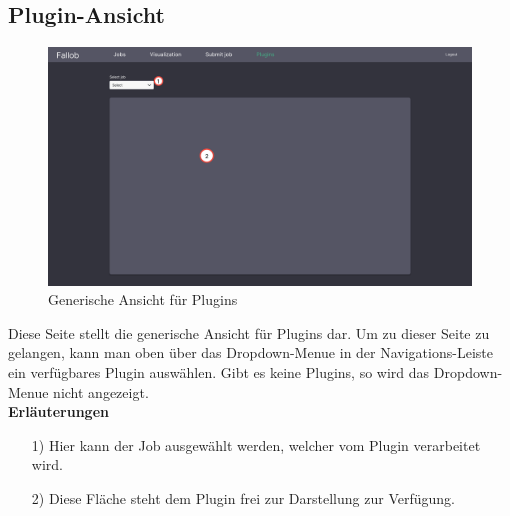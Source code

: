 
\subsection{Plugin-Ansicht}
\label{pages:plugin}
\begin{figure}[H]
    \centering
    \includegraphics[width=\textwidth]{images-interface/v4_interface/plugin_page_4.pdf}
    \caption{Generische Ansicht für Plugins}
    \label{fig:plugin-page}
\end{figure}
Diese Seite stellt die generische Ansicht für Plugins dar. Um zu dieser Seite zu gelangen, kann man oben über das \gls{Dropdown-Menue} in der Navigations-Leiste ein verfügbares Plugin auswählen. Gibt es keine Plugins, so wird das \gls{Dropdown-Menue} nicht angezeigt. \\

\textbf{Erläuterungen}
\begin{itemize}
    \item[1)] Hier kann der Job ausgewählt werden, welcher vom Plugin verarbeitet wird.
    \item[2)] Diese Fläche steht dem Plugin frei zur Darstellung zur Verfügung.
\end{itemize}

\newpage
